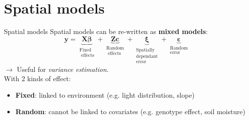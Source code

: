 \documentclass[]{beamer}
\begin{document}

\section{Spatial models}

\begin{frame}{Spatial models}
Spatial models can be re-written as \textbf{mixed models}:
\[\mathbf{y}=\underbrace{\mathbf{X} \boldsymbol{\beta}}_{\substack{\text{Fixed}\\ \text{ effects}}}+\underbrace{\mathbf{Z} \mathbf{c}}_{\substack{\text{Random} \\ \text{ effects}}}+\underbrace{\boldsymbol{\xi}}_{\substack{\text{Spatially} \\ \text{dependant} \\ \text{error}}}+\underbrace{\boldsymbol{\varepsilon}}_{\substack{\text{Random}\\\text{error}}}\]
$\rightarrow$ Useful for \emph{variance estimation}.\\

With 2 kinds of effect:
\begin{itemize}
    \item \textbf{Fixed}: linked to environment (e.g. light distribution, slope)
    \item \textbf{Random}: cannot be linked to covariates (e.g. genotype effect, soil moisture) 
\end{itemize}

\end{frame}
\end{document}
